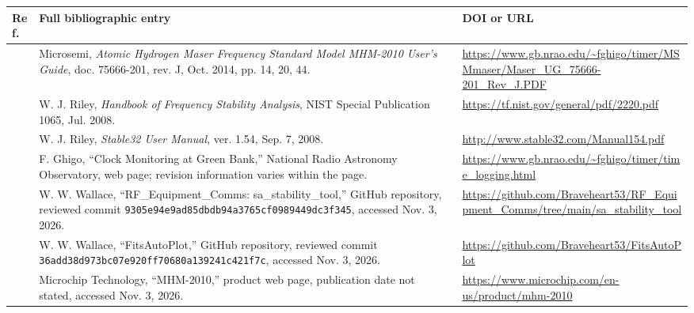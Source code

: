 \documentclass[11pt,a4paper]{article}
\begin{document}
\small
\begin{longtable}{@{}p{.05\linewidth}p{.53\linewidth}p{.34\linewidth}@{}}
\toprule
Ref. & Full bibliographic entry & DOI or URL\\
\midrule
\endhead
[1] & Microsemi, \textit{Atomic Hydrogen Maser Frequency Standard Model
MHM-2010 User's Guide}, doc. 75666-201, rev. J, Oct. 2014, pp. 14, 20, 44.
& \url{https://www.gb.nrao.edu/~fghigo/timer/MSMmaser/Maser_UG_75666-201_Rev_J.PDF}\\[5pt]
[2] & W. J. Riley, \textit{Handbook of Frequency Stability Analysis},
NIST Special Publication 1065, Jul. 2008.
& \url{https://tf.nist.gov/general/pdf/2220.pdf}\\[5pt]
[3] & W. J. Riley, \textit{Stable32 User Manual}, ver. 1.54,
Sep. 7, 2008.
& \url{http://www.stable32.com/Manual154.pdf}\\[5pt]
[4] & F. Ghigo, ``Clock Monitoring at Green Bank,'' National Radio Astronomy
Observatory, web page; revision information varies within the page.
& \url{https://www.gb.nrao.edu/~fghigo/timer/time_logging.html}\\[5pt]
[5] & W. W. Wallace, ``RF\_Equipment\_Comms: sa\_stability\_tool,''
GitHub repository, reviewed commit
\texttt{9305e94e9ad85dbdb94a3765cf0989449dc3f345}, accessed Nov. 3, 2026.
& \url{https://github.com/Braveheart53/RF_Equipment_Comms/tree/main/sa_stability_tool}\\[5pt]
[6] & W. W. Wallace, ``FitsAutoPlot,'' GitHub repository, reviewed commit
\texttt{36add38d973bc07e920ff70680a139241c421f7c}, accessed Nov. 3, 2026.
& \url{https://github.com/Braveheart53/FitsAutoPlot}\\[5pt]
[7] & Microchip Technology, ``MHM-2010,'' product web page, publication date
not stated, accessed Nov. 3, 2026.
& \url{https://www.microchip.com/en-us/product/mhm-2010}\\
\bottomrule
\end{longtable}
\normalsize
\end{document}
